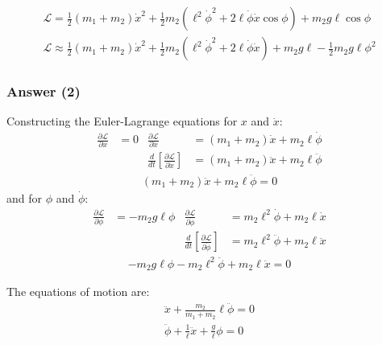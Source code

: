 \begin{align}
	\boxed{
	\mathcal{L} = \frac{1}{2} (m_1 + m_2)\dot x^2 + \frac{1}{2} m_2 \left(
		\ell ^2\dot \phi ^2 + 2\ell \dot \phi \dot x\cos \phi  \right) + m_2g\ell \cos \phi 
	}
	\\
	\boxed{
	\mathcal{L} \approx \frac{1}{2} (m_1 + m_2)\dot x^2 + \frac{1}{2} m_2 \left(
		\ell ^2\dot \phi ^2 + 2\ell \dot \phi \dot x \right) + m_2g\ell  - \frac{1}{2}m_2g\ell \phi ^2
	}
\end{align}

\subsubsection{Answer (2)}
Constructing the Euler-Lagrange equations for $x$ and $\dot x$:
\begin{align*}
	\frac{\partial \mathcal{L}}{\partial x} &= 0 &
		\frac{\partial \mathcal{L}}{\partial \dot x} &= (m_1 + m_2)\dot x + m_2\ell \dot \phi 
	\\
	{}&{}&
	\frac{d}{dt}\left[ \frac{\partial \mathcal{L}}{\partial \dot x} \right]
		&= (m_1 + m_2)\ddot x + m_2\ell \ddot \phi 
\end{align*}
\begin{align}
	(m_1 + m_2)\ddot x + m_2\ell \ddot \phi  = 0
\end{align}
and for $\phi $ and $\dot \phi $:
\begin{align*}
	\frac{\partial \mathcal{L}}{\partial \phi } &= -m_2g\ell \phi  &
		\frac{\partial \mathcal{L}}{\partial \dot \phi } &= m_2\ell ^2\dot \phi  + m_2\ell \dot x
	\\
	{}&{}&
	\frac{d}{dt}\left[ \frac{\partial \mathcal{L}}{\partial \dot \phi } \right]
		&= m_2\ell ^2\ddot \phi  + m_2\ell \ddot x
\end{align*}
\begin{align}
	-m_2g\ell \phi  - m_2\ell ^2\ddot \phi  + m_2\ell \ddot x = 0
\end{align}

The equations of motion are:
\begin{align}
	\boxed{
	\ddot x + \frac{m_2}{m_1+m_2} \ell  \ddot \phi  = 0
	} \\
	\boxed{
	\ddot \phi  + \frac{1}{\ell }\ddot x + \frac{g}{\ell }\phi  = 0
	}
\end{align}

